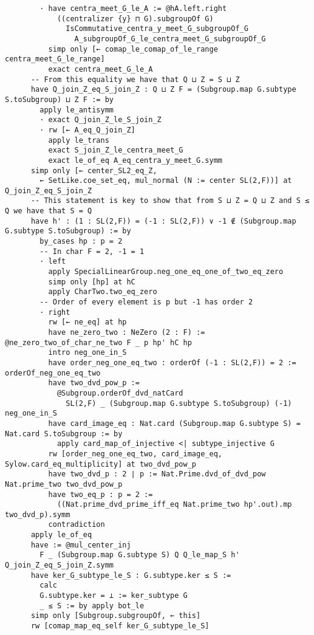 \begin{tiny}
\begin{verbatim}
        · have centra_meet_G_le_A := @hA.left.right
            ((centralizer {y} ⊓ G).subgroupOf G)
              IsCommutative_centra_y_meet_G_subgroupOf_G
                A_subgroupOf_G_le_centra_meet_G_subgroupOf_G
          simp only [← comap_le_comap_of_le_range centra_meet_G_le_range]
          exact centra_meet_G_le_A
      -- From this equality we have that Q ⊔ Z = S ⊔ Z
      have Q_join_Z_eq_S_join_Z : Q ⊔ Z F = (Subgroup.map G.subtype S.toSubgroup) ⊔ Z F := by
        apply le_antisymm
        · exact Q_join_Z_le_S_join_Z
        · rw [← A_eq_Q_join_Z]
          apply le_trans
          exact S_join_Z_le_centra_meet_G
          exact le_of_eq A_eq_centra_y_meet_G.symm
      simp only [← center_SL2_eq_Z,
        ← SetLike.coe_set_eq, mul_normal (N := center SL(2,F))] at Q_join_Z_eq_S_join_Z
      -- This statement is key to show that from S ⊔ Z = Q ⊔ Z and S ≤ Q we have that S = Q
      have h' : (1 : SL(2,F)) = (-1 : SL(2,F)) ∨ -1 ∉ (Subgroup.map G.subtype S.toSubgroup) := by
        by_cases hp : p = 2
        -- In char F = 2, -1 = 1
        · left
          apply SpecialLinearGroup.neg_one_eq_one_of_two_eq_zero
          simp only [hp] at hC
          apply CharTwo.two_eq_zero
        -- Order of every element is p but -1 has order 2
        · right
          rw [← ne_eq] at hp
          have ne_zero_two : NeZero (2 : F) := @ne_zero_two_of_char_ne_two F _ p hp' hC hp
          intro neg_one_in_S
          have order_neg_one_eq_two : orderOf (-1 : SL(2,F)) = 2 := orderOf_neg_one_eq_two
          have two_dvd_pow_p :=
            @Subgroup.orderOf_dvd_natCard
              SL(2,F) _ (Subgroup.map G.subtype S.toSubgroup) (-1) neg_one_in_S
          have card_image_eq : Nat.card (Subgroup.map G.subtype S) = Nat.card S.toSubgroup := by
            apply card_map_of_injective <| subtype_injective G
          rw [order_neg_one_eq_two, card_image_eq, Sylow.card_eq_multiplicity] at two_dvd_pow_p
          have two_dvd_p : 2 ∣ p := Nat.Prime.dvd_of_dvd_pow Nat.prime_two two_dvd_pow_p
          have two_eq_p : p = 2 :=
            ((Nat.prime_dvd_prime_iff_eq Nat.prime_two hp'.out).mp two_dvd_p).symm
          contradiction
      apply le_of_eq
      have := @mul_center_inj
        F _ (Subgroup.map G.subtype S) Q Q_le_map_S h' Q_join_Z_eq_S_join_Z.symm
      have ker_G_subtype_le_S : G.subtype.ker ≤ S :=
        calc
        G.subtype.ker = ⊥ := ker_subtype G
        _ ≤ S := by apply bot_le
      simp only [Subgroup.subgroupOf, ← this]
      rw [comap_map_eq_self ker_G_subtype_le_S]
\end{verbatim}
\end{tiny}

